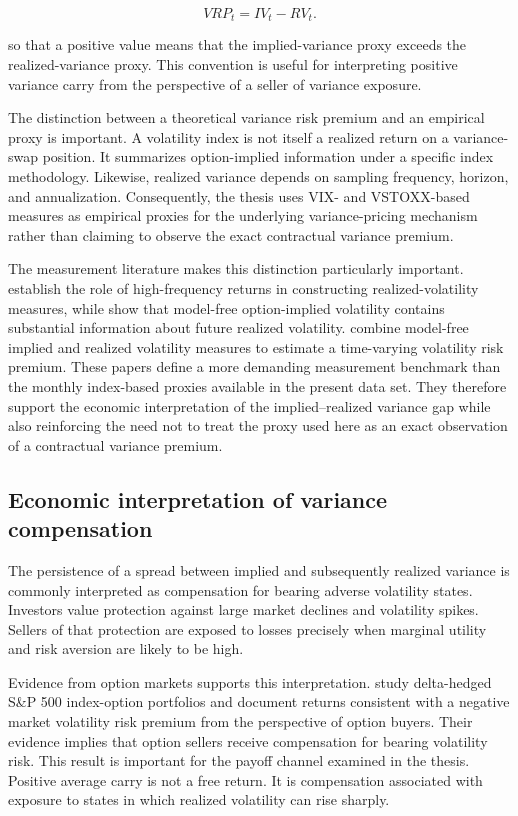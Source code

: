 \begin{equation}
VRP_t = IV_t - RV_t.
\end{equation}

so that a positive value means that the implied-variance proxy exceeds the realized-variance proxy. This convention is useful for interpreting positive variance carry from the perspective of a seller of variance exposure.

The distinction between a theoretical variance risk premium and an empirical proxy is important. A volatility index is not itself a realized return on a variance-swap position. It summarizes option-implied information under a specific index methodology. Likewise, realized variance depends on sampling frequency, horizon, and annualization. Consequently, the thesis uses VIX- and VSTOXX-based measures as empirical proxies for the underlying variance-pricing mechanism rather than claiming to observe the exact contractual variance premium.

The measurement literature makes this distinction particularly important. \textcite{AndersenBollerslevDieboldLabys2003} establish the role of high-frequency returns in constructing realized-volatility measures, while \textcite{JiangTian2005} show that model-free option-implied volatility contains substantial information about future realized volatility. \textcite{BollerslevGibsonZhou2011} combine model-free implied and realized volatility measures to estimate a time-varying volatility risk premium. These papers define a more demanding measurement benchmark than the monthly index-based proxies available in the present data set. They therefore support the economic interpretation of the implied--realized variance gap while also reinforcing the need not to treat the proxy used here as an exact observation of a contractual variance premium.

\subsection{Economic interpretation of variance compensation}

The persistence of a spread between implied and subsequently realized variance is commonly interpreted as compensation for bearing adverse volatility states. Investors value protection against large market declines and volatility spikes. Sellers of that protection are exposed to losses precisely when marginal utility and risk aversion are likely to be high.

Evidence from option markets supports this interpretation. \textcite{BakshiKapadia2003} study delta-hedged S\&P 500 index-option portfolios and document returns consistent with a negative market volatility risk premium from the perspective of option buyers. Their evidence implies that option sellers receive compensation for bearing volatility risk. This result is important for the payoff channel examined in the thesis. Positive average carry is not a free return. It is compensation associated with exposure to states in which realized volatility can rise sharply.

